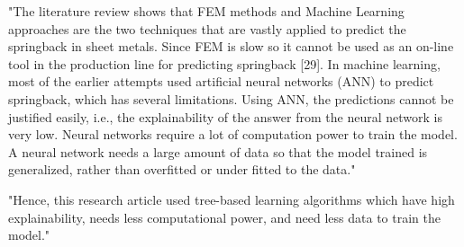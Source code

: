 "The literature review shows that FEM methods and Machine Learning approaches are the two techniques that are vastly applied to predict the springback in sheet metals. Since FEM is slow so it cannot be used as an on-line tool in the production line for predicting springback [29]. In machine learning, most of the earlier attempts used artificial neural networks (ANN) to predict springback, which has several limitations. Using ANN, the predictions cannot be justified easily, i.e., the explainability of the answer from the neural network is very low. Neural networks require a lot of computation power to train the model. A neural network needs a large amount of data so that the model trained is generalized, rather than overfitted or under fitted to the data."
\cite{baig_machinelearningprediction_2021}

"Hence, this research article used tree-based learning algorithms which have high explainability, needs less computational power, and need less data to train the model." 
\cite{baig_machinelearningprediction_2021}




